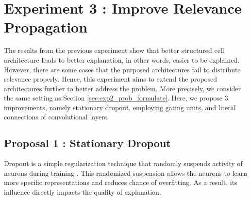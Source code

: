 \section{Experiment 3 : Improve Relevance Propagation}
The results from the previous experiment show that better structured cell architecture leads to better explanation, in other words, easier to be explained. However, there are some cases that the purposed architectures fail to distribute relevance properly.  Hence, this experiment aims to extend the proposed architectures further to better address the problem. More precisely, we consider the same setting as Section \ref{sec:exp2_prob_formulate}. Here, we propose 3 improvements, namely stationary dropout, employing gating units,  and literal connections of convolutional layers.


\subsection{Proposal 1 :  Stationary Dropout}
Dropout is a simple regularization technique that randomly suspends activity of neurons during training\cite{SrivastavaDropoutSimpleWay2014} . This randomized suspension allows the neurons to learn more specific representations and reduces chance of overfitting.  As a result, its influence directly impacts the quality of explanation. 





\begin{figure}[!htb]
\centering
{} \\

\label{fig:dropout_lstm}
\end{figure}

